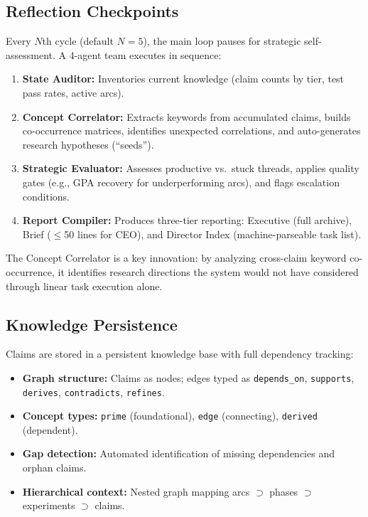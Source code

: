 \documentclass[11pt,a4paper]{article}
\begin{document}
\subsection{Reflection Checkpoints}
\label{sec:reflection}

Every $N$th cycle (default $N=5$), the main loop pauses for strategic self-assessment.
A 4-agent team executes in sequence:

\begin{enumerate}[nosep]
    \item \textbf{State Auditor:} Inventories current knowledge (claim counts by
          tier, test pass rates, active arcs).
    \item \textbf{Concept Correlator:} Extracts keywords from accumulated claims,
          builds co-occurrence matrices, identifies unexpected correlations, and
          auto-generates research hypotheses (``seeds'').
    \item \textbf{Strategic Evaluator:} Assesses productive vs.\ stuck threads,
          applies quality gates (e.g., GPA recovery for underperforming arcs),
          and flags escalation conditions.
    \item \textbf{Report Compiler:} Produces three-tier reporting: Executive
          (full archive), Brief ($\leq$50 lines for CEO), and Director Index
          (machine-parseable task list).
\end{enumerate}

The Concept Correlator is a key innovation: by analyzing cross-claim keyword
co-occurrence, it identifies research directions the system would not have
considered through linear task execution alone.

\subsection{Knowledge Persistence}
\label{sec:knowledge}

Claims are stored in a persistent knowledge base with full dependency tracking:

\begin{itemize}[nosep]
    \item \textbf{Graph structure:} Claims as nodes; edges typed as
          \texttt{depends\_on}, \texttt{supports}, \texttt{derives},
          \texttt{contradicts}, \texttt{refines}.
    \item \textbf{Concept types:} \texttt{prime} (foundational),
          \texttt{edge} (connecting), \texttt{derived} (dependent).
    \item \textbf{Gap detection:} Automated identification of missing
          dependencies and orphan claims.
    \item \textbf{Hierarchical context:} Nested graph mapping
          arcs $\supset$ phases $\supset$ experiments $\supset$ claims.
\end{itemize}
\end{document}
